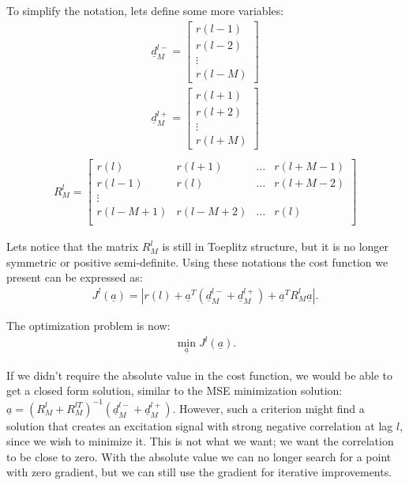 \documentclass[journal,onecolumn]{IEEEtran}
\begin{document}
To simplify the notation, lets define some more variables:
\begin{align*}
\underline{d}_M^{l-} = \begin{bmatrix} r(l-1) \\ r(l-2) \\ \vdots \\ r(l-M) \end{bmatrix} \\
\underline{d}_M^{l+} = \begin{bmatrix} r(l+1) \\ r(l+2) \\ \vdots \\ r(l+M) \end{bmatrix} \\
\end{align*}
\begin{align*}
R_M^l =
\begin{bmatrix}
r(l) & r(l+1) & \ldots & r(l+M-1) \\
r(l-1) & r(l) & \ldots & r(l+M-2) \\
\vdots & & & \\
r(l-M+1) & r(l-M+2) & \ldots & r(l) \\
\end{bmatrix}
\end{align*}

Lets notice that the matrix $R_M^l$ is still in Toeplitz structure, but it is no longer symmetric or positive semi-definite.
Using these notations the cost function we present can be expressed as:
\begin{align*}
J^l(\underline{a}) = \left| r(l) + \underline{a}^T\left( \underline{d}_M^{l-} + \underline{d}_M^{l+} \right) + \underline{a}^T R_M^l\underline{a} \right|.
\end{align*}

The optimization problem is now:
\begin{align*}
\min\limits_{\underline{a}}{J^l(\underline{a})}.
\end{align*}

If we didn't require the absolute value in the cost function, we would be able to get a closed form solution, similar to the MSE minimization solution: $\underline{a} = \left( R_M^l + R_M^{lT} \right)^{-1}\left( \underline{d}_M^{l-} + \underline{d}_M^{l+} \right)$. However, such a criterion might find a solution that creates an excitation signal with strong negative correlation at lag $l$, since we wish to minimize it. This is not what we want; we want the correlation to be close to zero. With the absolute value we can no longer search for a point with zero gradient, but we can still use the gradient for iterative improvements.
\end{document}
